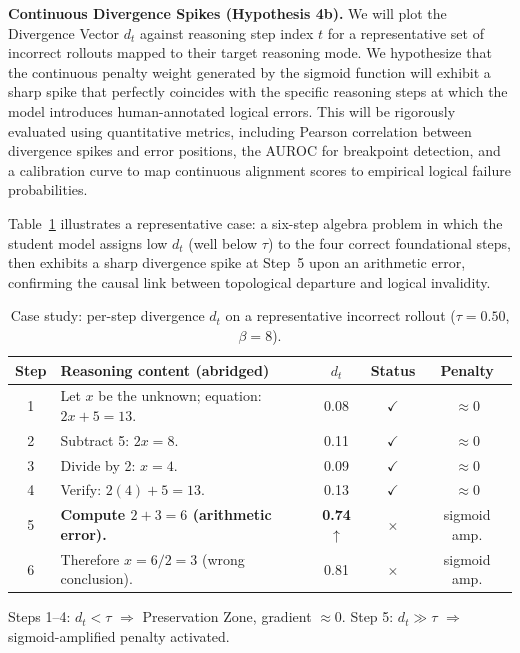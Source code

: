 \documentclass[conference]{IEEEtran}
\begin{document}
\textbf{Continuous Divergence Spikes (Hypothesis 4b).} We will plot the Divergence Vector $d_t$ against reasoning step index $t$ for a representative set of incorrect rollouts mapped to their target reasoning mode. We hypothesize that the continuous penalty weight generated by the sigmoid function will exhibit a sharp spike that perfectly coincides with the specific reasoning steps at which the model introduces human-annotated logical errors. This will be rigorously evaluated using quantitative metrics, including Pearson correlation between divergence spikes and error positions, the AUROC for breakpoint detection, and a calibration curve to map continuous alignment scores to empirical logical failure probabilities.

Table~\ref{tab:casestudy} illustrates a representative case: a six-step algebra problem in which the student model assigns low $d_t$ (well below $\tau$) to the four correct foundational steps, then exhibits a sharp divergence spike at Step~5 upon an arithmetic error, confirming the causal link between topological departure and logical invalidity.

\begin{table}[htbp]
\centering
\small
\caption{
Case study: per-step divergence $d_t$ on a representative
incorrect rollout ($\tau = 0.50$, $\beta = 8$).
}
\label{tab:casestudy}

\begin{tabularx}{\linewidth}{c X c c c}
\toprule
\textbf{Step} &
\textbf{Reasoning content (abridged)} &
\boldmath$d_t$ &
\textbf{Status} &
\textbf{Penalty} \\
\midrule

1 &
Let $x$ be the unknown; equation: $2x+5=13$. &
0.08 &
\textcolor{blue!80!black}{$\checkmark$} &
$\approx 0$ \\

2 &
Subtract 5: $2x = 8$. &
0.11 &
\textcolor{blue!80!black}{$\checkmark$} &
$\approx 0$ \\

3 &
Divide by 2: $x = 4$. &
0.09 &
\textcolor{blue!80!black}{$\checkmark$} &
$\approx 0$ \\

4 &
Verify: $2(4)+5 = 13$. &
0.13 &
\textcolor{blue!80!black}{$\checkmark$} &
$\approx 0$ \\

\rowcolor{red!12}
5 &
\textbf{Compute $2+3=6$ (arithmetic error).} &
\textbf{0.74}$\uparrow$ &
\textcolor{red!80!black}{$\times$} &
sigmoid amp. \\

\rowcolor{red!12}
6 &
Therefore $x = 6/2 = 3$ (wrong conclusion). &
0.81 &
\textcolor{red!80!black}{$\times$} &
sigmoid amp. \\

\bottomrule
\end{tabularx}

\vspace{2pt}
\footnotesize
Steps 1--4: $d_t < \tau$ $\Rightarrow$
Preservation Zone, gradient $\approx 0$.
Step 5: $d_t \gg \tau$ $\Rightarrow$
sigmoid-amplified penalty activated.

\end{table}
\end{document}

